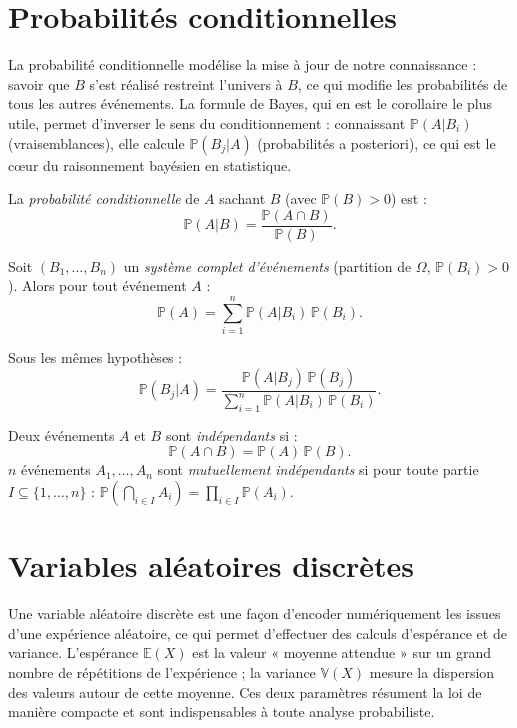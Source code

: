 \documentclass[11pt,a4paper,twoside]{book}
\begin{document}
\section{Probabilités conditionnelles}

La probabilité conditionnelle modélise la mise à jour de notre connaissance : savoir que $B$ s'est réalisé restreint l'univers à $B$, ce qui modifie les probabilités de tous les autres événements. La formule de Bayes, qui en est le corollaire le plus utile, permet d'inverser le sens du conditionnement : connaissant $\mathbb{P}(A|B_i)$ (vraisemblances), elle calcule $\mathbb{P}(B_j|A)$ (probabilités a posteriori), ce qui est le cœur du raisonnement bayésien en statistique.

\begin{definitionbox}
La \emph{probabilité conditionnelle} de $A$ sachant $B$ (avec $\mathbb{P}(B)>0$) est :
\[
  \mathbb{P}(A|B) = \frac{\mathbb{P}(A\cap B)}{\mathbb{P}(B)}.
\]
\end{definitionbox}

\begin{theoremebox}
Soit $(B_1,\ldots,B_n)$ un \emph{système complet d'événements} (partition de $\Omega$, $\mathbb{P}(B_i)>0$). Alors pour tout événement $A$ :
\[
  \mathbb{P}(A) = \sum_{i=1}^n \mathbb{P}(A|B_i)\,\mathbb{P}(B_i).
\]
\end{theoremebox}

\begin{theoremebox}
Sous les mêmes hypothèses :
\[
  \mathbb{P}(B_j|A) = \frac{\mathbb{P}(A|B_j)\,\mathbb{P}(B_j)}{\displaystyle\sum_{i=1}^n \mathbb{P}(A|B_i)\,\mathbb{P}(B_i)}.
\]
\end{theoremebox}

\begin{definitionbox}[Indépendance]
Deux événements $A$ et $B$ sont \emph{indépendants} si :
\[
  \mathbb{P}(A\cap B) = \mathbb{P}(A)\,\mathbb{P}(B).
\]
$n$ événements $A_1,\ldots,A_n$ sont \emph{mutuellement indépendants} si pour toute partie $I\subseteq\{1,\ldots,n\}$ :
$\mathbb{P}\!\left(\bigcap_{i\in I}A_i\right)=\prod_{i\in I}\mathbb{P}(A_i)$.
\end{definitionbox}

\section{Variables aléatoires discrètes}

Une variable aléatoire discrète est une façon d'encoder numériquement les issues d'une expérience aléatoire, ce qui permet d'effectuer des calculs d'espérance et de variance. L'espérance $\mathbb{E}(X)$ est la valeur « moyenne attendue » sur un grand nombre de répétitions de l'expérience ; la variance $\mathbb{V}(X)$ mesure la dispersion des valeurs autour de cette moyenne. Ces deux paramètres résument la loi de manière compacte et sont indispensables à toute analyse probabiliste.
\end{document}
